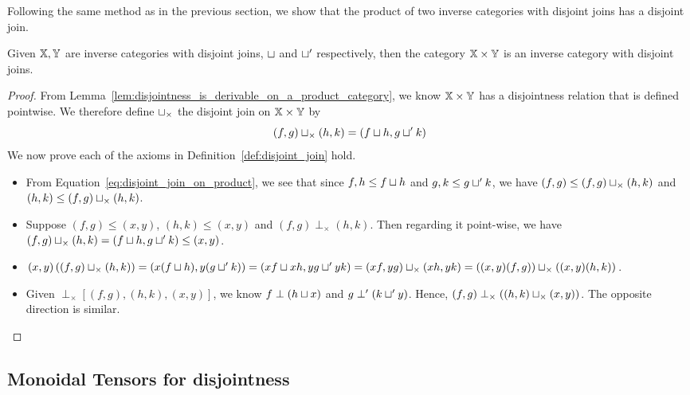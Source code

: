 Following the same method as in the previous section, we show that the product of two
inverse categories with disjoint joins has a disjoint join.
\begin{lemma}\label{lem:disjoint_join_is_in_product_category}
  Given $\mathbb{X}, \mathbb{Y}$ are inverse categories with disjoint joins, $\sqcup$ and $\sqcup'$ respectively,
  then the category $\mathbb{X} \times \mathbb{Y}$ is an inverse category with disjoint joins.
\end{lemma}
\begin{proof}
  From Lemma~\ref{lem:disjointness_is_derivable_on_a_product_category}, we know $\mathbb{X}\times\mathbb{Y}$ has a
  disjointness relation that is defined pointwise.  We therefore define $\sqcup_{\times}$ the
  disjoint join on $\mathbb{X}\times\mathbb{Y}$ by
  \begin{equation}
    (f,g)\sqcup_{\times}(h,k) = (f \sqcup h, g \sqcup' k) \label{eq:disjoint_join_on_product}
  \end{equation}
  We now prove each of the axioms in Definition~\ref{def:disjoint_join} hold.
  \begin{itemize}
    \item [\axiom{DJ}{1}] From Equation~\eqref{eq:disjoint_join_on_product}, we see that since
      $f,h \le f \sqcup h$ and $g,k \le g \sqcup' k$, we have $(f,g) \le (f,g)\sqcup_{\times}(h,k)$
      and  $(h,k) \le (f,g)\sqcup_{\times}(h,k)$.
    \item [\axiom{DJ}{2}] Suppose $(f,g) \le (x,y)$, $(h,k) \le (x,y)$ and $(f,g) \perp_{\times} (h,k)$. Then
      regarding it point-wise, we have
      $(f,g)\sqcup_{\times}(h,k) = (f \sqcup h, g \sqcup' k)   \le (x,y)$.
    \item [\axiom{DJ}{3}] $(x,y)\left((f,g)\sqcup_{\times}(h,k)\right) = (x(f \sqcup h), y(g \sqcup' k))
      = (x f \sqcup x h, y g \sqcup' y k) = (x f,y g)\sqcup_{\times}(x h,y k) =
      ((x,y)(f,g))\sqcup_{\times}((x,y)(h,k))$.
    \item [\axiom{DJ}{4}] Given $\perp_{\times}\!\![(f,g),(h,k),(x,y)]$, we know $f \perp (h\sqcup x)$ and
      $g \perp' (k\sqcup' y)$. Hence, $(f,g) \perp_{\times}((h,k)\sqcup_{\times}(x,y))$. The
      opposite direction is similar.
  \end{itemize}
\end{proof}


\subsection{Monoidal Tensors for disjointness} %
\label{sub:tensors_for_disjointness}

